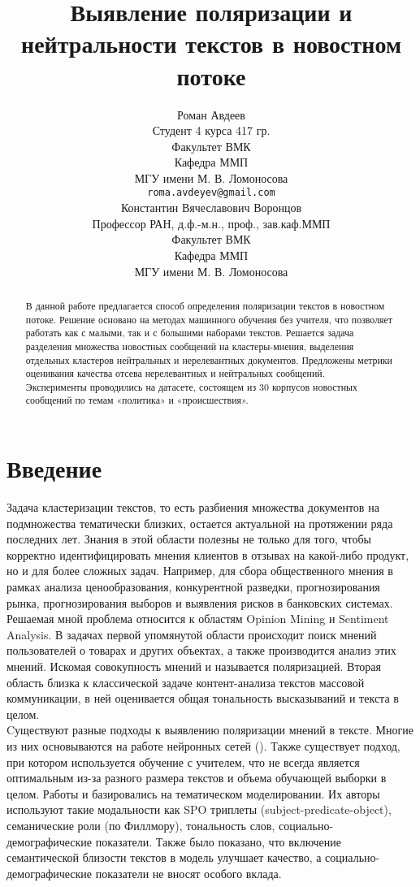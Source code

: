 \documentclass{article}
\title{Выявление поляризации и нейтральности текстов в новостном потоке}
\author{Роман Авдеев \\
	Студент 4 курса 417 гр.\\
	Факультет ВМК\\
        Кафедра ММП\\
	МГУ имени М. В. Ломоносова \\
	\texttt{roma.avdeyev@gmail.com} \\
	\And
	Константин Вячеславович Воронцов\\
        Профессор РАН, д.ф.-м.н., проф., зав.каф.ММП\\
	Факультет ВМК\\
        Кафедра ММП\\
	МГУ имени М. В. Ломоносова \\
}
\date{}
\begin{document}
\maketitle

\begin{abstract}
	В данной работе предлагается способ определения поляризации текстов в новостном потоке. Решение основано на методах машинного обучения без учителя, что позволяет работать как с малыми, так и с большими наборами текстов. Решается задача разделения множества новостных сообщений на кластеры-мнения, выделения отдельных кластеров нейтральных и нерелевантных документов. Предложены метрики оценивания качества отсева нерелевантных и нейтральных сообщений.\\ Эксперименты проводились на датасете, состоящем из 30 корпусов новостных сообщений по темам «политика» и «происшествия».
\end{abstract}



\section{Введение}
Задача кластеризации текстов, то есть разбиения множества документов на подмножества тематически близких, остается актуальной на протяжении ряда последних лет. Знания в этой области полезны не только для того, чтобы корректно идентифицировать мнения клиентов в отзывах на какой-либо продукт, но и для более сложных задач. Например, для сбора общественного мнения в рамках анализа ценообразования, конкурентной разведки, прогнозирования рынка, прогнозирования выборов и выявления рисков в банковских системах. \\

Решаемая мной проблема относится к областям Opinion Mining и Sentiment Analysis. В задачах первой упомянутой области происходит поиск мнений пользователей о товарах и других объектах, а также производится анализ этих мнений. Искомая совокупность мнений и называется поляризацией. Вторая область близка к классической задаче контент-анализа текстов массовой коммуникации, в ней оценивается общая тональность высказываний и текста в целом.\\
Cуществуют разные подходы к выявлению поляризации мнений в тексте. Многие из них основываются на работе нейронных сетей (\cite{litlink10}). Также существует подход, при котором используется обучение с учителем, что не всегда является оптимальным из-за разного размера текстов и объема обучающей выборки в целом. Работы \cite{litlink1} и \cite{litlink3} базировались на тематическом моделировании. Их авторы используют такие модальности как SPO триплеты (subject-predicate-object), семанические роли (по Филлмору), тональность слов, социально-демографические показатели. Также было показано, что включение семантической близости текстов в модель улучшает качество, а социально-демографические показатели не вносят особого вклада.\\
\end{document}
